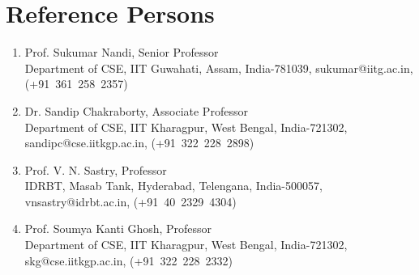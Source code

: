 \documentclass{article}
\begin{document}
\section{Reference Persons}
  \begin{enumerate}
  \item Prof. Sukumar Nandi, Senior Professor\\Department of CSE, IIT Guwahati, Assam, India-781039, sukumar@iitg.ac.in, (+91~361~258~2357)
  \item Dr. Sandip Chakraborty, Associate Professor\\Department of CSE, IIT Kharagpur, West Bengal, India-721302, sandipc@cse.iitkgp.ac.in, (+91~322~228~2898)
  \item Prof. V. N. Sastry, Professor\\IDRBT, Masab Tank, Hyderabad, Telengana, India-500057, vnsastry@idrbt.ac.in, (+91~40~2329~4304)
  \item Prof. Soumya Kanti Ghosh, Professor\\Department of CSE, IIT Kharagpur, West Bengal, India-721302, skg@cse.iitkgp.ac.in, (+91~322~228~2332)
  \end{enumerate}
\end{document}
